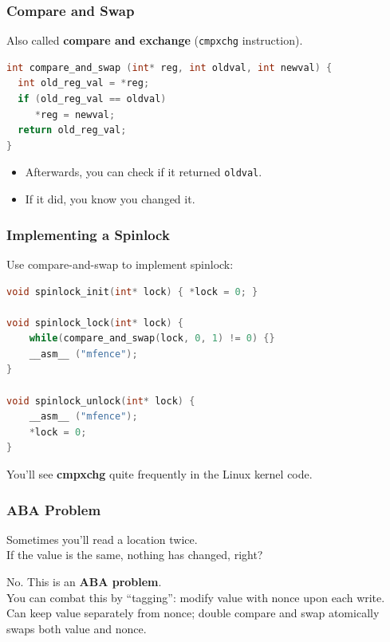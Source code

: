 \begin{frame}[fragile]
  \frametitle{Compare and Swap}

  
  Also called {\bf compare and exchange} ({\tt cmpxchg} instruction).

  \begin{lstlisting}[language=C]
int compare_and_swap (int* reg, int oldval, int newval) {
  int old_reg_val = *reg;
  if (old_reg_val == oldval) 
     *reg = newval;
  return old_reg_val;
}
  \end{lstlisting}

  \begin{itemize}
    \item Afterwards, you can check if it returned {\tt oldval}.
    \item If it did, you know you changed it.
  \end{itemize}
  
\end{frame}

\begin{frame}[fragile]
  \frametitle{Implementing a Spinlock}

  
  Use compare-and-swap to implement spinlock:
  \begin{lstlisting}[language=C]
void spinlock_init(int* lock) { *lock = 0; }

void spinlock_lock(int* lock) {
    while(compare_and_swap(lock, 0, 1) != 0) {}
    __asm__ ("mfence");
}

void spinlock_unlock(int* lock) {
    __asm__ ("mfence");
    *lock = 0;  
}
  \end{lstlisting}
  You'll see {\bf cmpxchg} quite frequently in the Linux kernel code.
  
\end{frame}

\begin{frame}[fragile]
  \frametitle{ABA Problem}

  
    Sometimes you'll read a location twice.\\[1em]

    If the value is the same, nothing has changed, right?

    \pause

    \alert{No.} This is an {\bf ABA problem}.\\[1em]

    You can combat this by ``tagging'': modify value with nonce upon each write.\\[1em]

    Can keep value separately from nonce; double compare and swap atomically swaps both value and nonce.\\[2em]


  
\end{frame}


